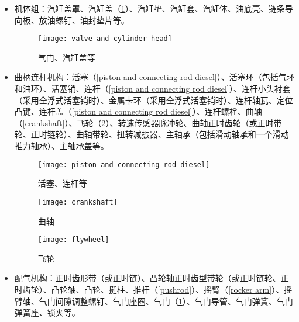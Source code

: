 \documentclass[UTF8]{ctexart}
\numberwithin{figure}{section}
\numberwithin{table}{section}
\begin{document}
\begin{itemize}
	\item 机体组：汽缸盖罩、汽缸盖（\cref{valve and cylinder head}）、汽缸垫、汽缸套、汽缸体、油底壳、链条导向板、放油螺钉、油封垫片等。

	      \begin{figure}[htbp]
		      \centering
		      \begin{minipage}[b]{0.4\textwidth}
			      \centering
			      \texttt{[image: valve and cylinder head]}
			      \caption{气门、汽缸盖等}
			      \label{valve and cylinder head}
		      \end{minipage}
	      \end{figure}

	\item 曲柄连杆机构：活塞（\cref{piston and connecting rod diesel}）、活塞环（包括气环和油环）、活塞销、连杆（\cref{piston and connecting rod diesel}）、连杆小头衬套（采用全浮式活塞销时）、金属卡环（采用全浮式活塞销时）、连杆轴瓦、定位凸键、连杆盖（\cref{piston and connecting rod diesel}）、连杆螺栓、曲轴（\cref{crankshaft}）、飞轮（\cref{flywheel}）、转速传感器脉冲轮、曲轴正时齿轮（或正时带轮、正时链轮）、曲轴带轮、扭转减振器、主轴承（包括滑动轴承和一个滑动推力轴承）、主轴承盖等。

	      \begin{figure}[htbp]
		      \centering
		      \begin{minipage}[b]{0.25\textwidth}
			      \centering
			      \texttt{[image: piston and connecting rod diesel]}
			      \caption{活塞、连杆等}
			      \label{piston and connecting rod diesel}
		      \end{minipage}
		      \begin{minipage}[b]{0.45\textwidth}
			      \centering
			      \texttt{[image: crankshaft]}
			      \caption{曲轴}
			      \label{crankshaft}
		      \end{minipage}
		      \begin{minipage}[b]{0.25\textwidth}
			      \centering
			      \texttt{[image: flywheel]}
			      \caption{飞轮}
			      \label{flywheel}
		      \end{minipage}
	      \end{figure}

	\item 配气机构：正时齿形带（或正时链）、凸轮轴正时齿型带轮（或正时链轮、正时齿轮）、凸轮轴、凸轮、挺柱、推杆（\cref{pushrod}）、摇臂（\cref{rocker arm}）、摇臂轴、气门间隙调整螺钉、气门座圈、气门（\cref{valve and cylinder head}）、气门导管、气门弹簧、气门弹簧座、锁夹等。


\end{itemize}
\end{document}
